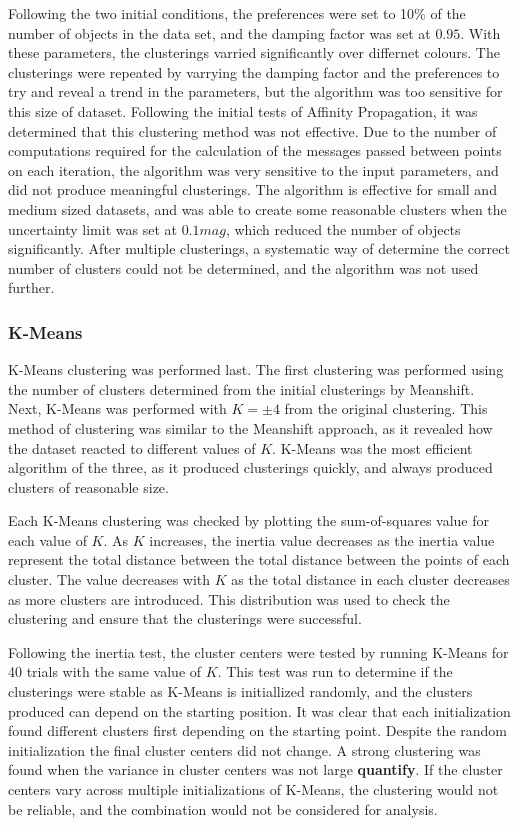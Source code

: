 Following the two initial conditions, the preferences were set to 10\% of the number of objects in the data set, and the damping factor was set at $0.95$.
With these parameters, the clusterings varried significantly over differnet colours.
The clusterings were repeated by varrying the damping factor and the preferences to try and reveal a trend in the parameters, but the algorithm was too sensitive for this size of dataset.
Following the initial tests of Affinity Propagation, it was determined that this clustering method was not effective.
Due to the number of computations required for the calculation of the messages passed between points on each iteration, the algorithm was very sensitive to the input parameters, and did not produce meaningful clusterings.
The algorithm is effective for small and medium sized datasets, and was able to create some reasonable clusters when the uncertainty limit was set at $0.1 mag$, which reduced the number of objects significantly. 
After multiple clusterings, a systematic way of determine the correct number of clusters could not be determined, and the algorithm was not used further.

\subsubsection{K-Means}
K-Means clustering was performed last.
The first clustering was performed using the number of clusters determined from the initial clusterings by Meanshift.
Next, K-Means was performed with $K = \pm 4$ from the original clustering.
This method of clustering was similar to the Meanshift approach, as it revealed how the dataset reacted to different values of $K$.
K-Means was the most efficient algorithm of the three, as it produced clusterings quickly, and always produced clusters of reasonable size.

Each K-Means clustering was checked by plotting the sum-of-squares value for each value of $K$.
As $K$ increases, the inertia value decreases as the inertia value represent the total distance between the total distance between the points of each cluster.
The value decreases with $K$ as the total distance in each cluster decreases as more clusters are introduced.
This distribution was used to check the clustering and ensure that the clusterings were successful.

Following the inertia test, the cluster centers were tested by running K-Means for 40 trials with the same value of $K$.
This test was run to determine if the clusterings were stable as K-Means is initiallized randomly, and the clusters produced can depend on the starting position.
It was clear that each initialization found different clusters first depending on the starting point. 
Despite the random initialization the final cluster centers did not change.
A strong clustering was found when the variance in cluster centers was not large \textbf{quantify}.
If the cluster centers vary across multiple initializations of K-Means, the clustering would not be reliable, and the combination would not be considered for analysis.

